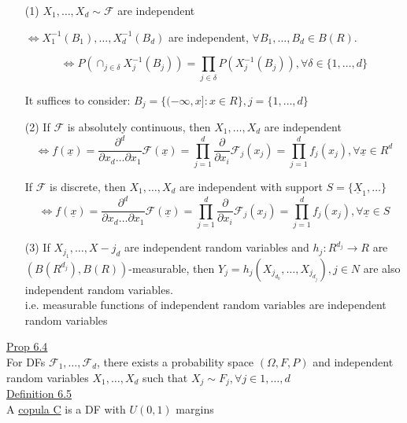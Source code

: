 \documentclass[10pt,letterpaper]{article}
\begin{document}
\begin{enumerate}

\item[(1)] $X_1,\dots,X_d\sim\mathcal{F}$ are independent
\begin{center}$\iff X_1^{-1}(B_1),\dots,X_d^{-1}(B_d)$ are independent, $\forall B_1,\dots,B_d\in B(R)$.\\\end{center}
$$\iff P(\cap_{j\in\delta}X_j^{-1}(B_j))=\prod_{j\in\delta}P(X_j^{-1}(B_j)), \forall\delta\in\{1,\dots,d\}$$

It suffices to consider: $B_j=\{(-\infty,x]:x\in R\}, j=\{1,\dots,d\}$

\item[(2)] If $\mathcal{F}$ is absolutely continuous, then $X_1,\dots,X_d$ are independent
$$\iff f(\underline{x})=\frac{\partial^d}{\partial{x_d}\dots\partial{x_1}}\mathcal{F}(\underline{x})= \prod_{j=1}^{d}\frac{\partial}{\partial{x_i}}\mathcal{F}_j(x_j)=\prod_{j=1}^{d}f_j(x_j), \forall\underline{x}\in R^d$$

If $\mathcal{F}$ is discrete, then $X_1,\dots,X_d$ are independent with support $S=\{\underline{X}_1,\dots\}$
$$\iff f(\underline{x})=\frac{\partial^d}{\partial{x_d}\dots\partial{x_1}}\mathcal{F}(\underline{x})= \prod_{j=1}^{d}\frac{\partial}{\partial{x_i}}\mathcal{F}_j(x_j)=\prod_{j=1}^{d}f_j(x_j), \forall\underline{x}\in S$$

\item[(3)] If $X_{j_1},\dots,X-{j_d}$ are independent random variables and $h_j:R^{d_j}\rightarrow R$ are $(B(R^{d_j}), B(R))$-measurable, then $Y_j=h_j(X_{j_{d_0}},\dots,X_{j_{d_j}}), j\in N$ are also independent random variables.\\

i.e. measurable functions of independent random variables are independent random variables

\end{enumerate}

\underline{Prop 6.4}\\

For DFs $\mathcal{F}_1,\dots,\mathcal{F}_d$, there exists a probability space $(\Omega, F, P)$ and independent random variables $X_1,\dots,X_d$ such that $X_j\sim F_j,\forall j\in{1,\dots,d}$\\

\underline{Definition 6.5}\\

A \underline{copula C} is a DF with $U(0,1)$ margins\\
\end{document}
